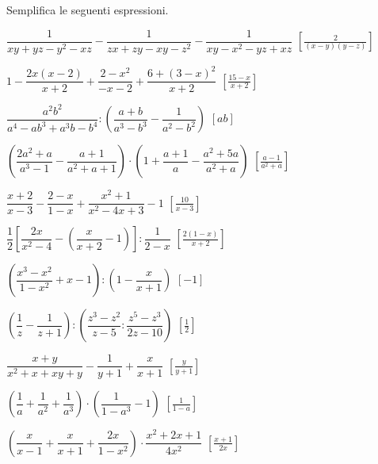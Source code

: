 \begin{esercizio}[\Ast]
\label{ese:19.38}
Semplifica le seguenti espressioni.
\begin{enumeratea}
 \item $\dfrac{1}{xy+yz-y^{2}-xz}-\dfrac{1}{zx+zy-xy-z^{2}}-
        \dfrac{1}{xy-x^{2}-yz+xz}$
  \hfill $\left[\frac{2}{(x-y)(y-z)}\right]$
 \item $1-\dfrac{2x(x-2)}{x+2}+\dfrac{2-x^{2}}{-x-2}+
        \dfrac{6+(3-x)^{2}}{x+2}$
  \hfill $\left[\frac{15-x}{x+2}\right]$
 \item $\dfrac{a^{2}b^{2}}{a^{4}-ab^{3}+a^{3}b-b^{4}}:
        \left(\dfrac{a+b}{a^{3}-b^{3}}-\dfrac{1}{a^{2}-b^{2}}\right)$
  \hfill $\left[ab\right]$
 \item $\left(\dfrac{2a^{2}+a}{a^{3}-1}-\dfrac{a+1}{a^{2}+a+1}\right)\cdot 
        \left(1+\dfrac{a+1}{a}-\dfrac{a^{2}+5a}{a^{2}+a}\right)$
  \hfill $\left[\frac{a-1}{a^{2}+a}\right]$
 \item $\dfrac{x+2}{x-3}-\dfrac{2-x}{1-x}+\dfrac{x^{2}+1}{x^{2}-4x+3}-1$
  \hfill $\left[\frac{10}{x-3}\right]$
 \item $\dfrac{1}{2}\left[\dfrac{2x}{x^{2}-4}-
        \left(\dfrac{x}{x+2}-1\right)\right]:\dfrac{1}{2-x}$
  \hfill $\left[\frac{2(1-x)}{x+2}\right]$
 \item $\left(\dfrac{x^{3}-x^{2}}{1-x^{2}}+x-1\right):
        \left(1-\dfrac{x}{x+1}\right)$
  \hfill $\left[-1\right]$
 \item $\left(\dfrac{1}{z}-\dfrac{1}{z+1}\right):
        \left(\dfrac{z^{3}-z^{2}}{z-5}:\dfrac{z^{5}-z^{3}}{2z-10}\right)$
  \hfill $\left[\frac{1}{2}\right]$
 \item $\dfrac{x+y}{x^{2}+x+xy+y}-\dfrac{1}{y+1}+\dfrac{x}{x+1}$
  \hfill $\left[\frac{y}{y+1}\right]$
 \item $\left(\dfrac{1}{a}+\dfrac{1}{a^{2}}+\dfrac{1}{a^{3}}\right)\cdot 
        \left(\dfrac{1}{1-a^{3}}-1\right)$
  \hfill $\left[\frac{1}{1-a}\right]$
 \item $\left(\dfrac{x}{x-1}+\dfrac{x}{x+1}+\dfrac{2x}{1-x^{2}}\right)\cdot 
       {\dfrac{x^{2}+2x+1}{4x^{2}}}$
  \hfill $\left[\frac{x+1}{2x}\right]$

\end{enumeratea}
\end{esercizio}
